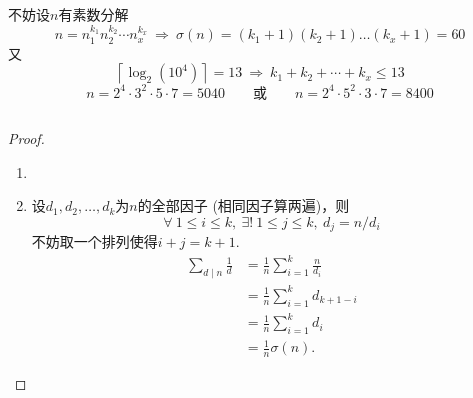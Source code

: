 \documentclass[UTF8]{ctexart}
\begin{document}
\subsection{}   %
不妨设$n$有素数分解
\[
    n = n_1^{k_1} n_2^{k_2} \cdots n_x^{k_x}
    \ \Rightarrow\ 
    \sigma(n) = 
    (k_1 + 1) (k_2 + 1 )\ldots (k_x + 1)=60
\]
又
\[
    \left\lceil \log_{2} (10^4)\right\rceil = 13  
    \ \Rightarrow\ 
    k_1 + k_2 + \cdots + k_x \leq 13  
\]
\[
    n = 2^4 \cdot 3^2 \cdot 5\cdot 7 = 5040
    \qquad
    \mbox{或}
    \qquad
    n = 2^4 \cdot 5^2 \cdot 3\cdot 7 = 8400
\]

\subsection{}   %
\begin{proof}
    \begin{enumerate}
        \item []
        \item []设$d_1,d_2,\ldots,d_k$为$n$的全部因子 (相同因子算两遍)，则
        \[
            \forall\ 1\leq i \leq k,\ \exists!\ 1 \leq j \leq k,\ 
            d_j = n/d_i
        \]
        不妨取一个排列使得$i+j=k+1$.
        \begin{align*}
            \sum\limits_{d\mid n} \frac{1}{d}
            & =
            \frac{1}{n} \sum\limits_{i=1}^{k} \frac{n}{d_i}\\
            & = 
            \frac{1}{n} \sum\limits_{i=1}^{k} d_{k+1-i}\\
            & =
            \frac{1}{n} \sum\limits_{i=1}^{k} d_{i}\\
            & = 
            \frac{1}{n} \sigma(n).
        \end{align*}
    \end{enumerate}
\end{proof}
\end{document}
